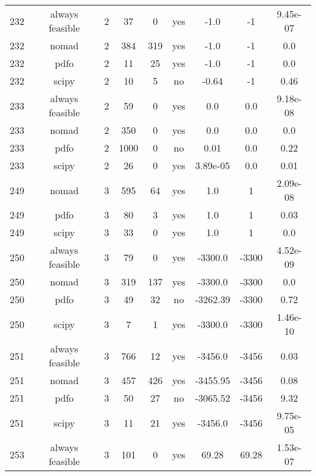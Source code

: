 \begin{scriptsize}
\begin{center}
\begin{longtable}{ccccccccc}
232 & always feasible &  2 &     37 &      0 &     yes &        -1.0 &          -1 & 9.45e-07\\
232 &           nomad &  2 &    384 &    319 &     yes &        -1.0 &          -1 &      0.0\\
232 &            pdfo &  2 &     11 &     25 &     yes &        -1.0 &          -1 &      0.0\\
232 &           scipy &  2 &     10 &      5 &      no &       -0.64 &          -1 &     0.46\\
233 & always feasible &  2 &     59 &      0 &     yes &         0.0 &         0.0 & 9.18e-08\\
233 &           nomad &  2 &    350 &      0 &     yes &         0.0 &         0.0 &      0.0\\
233 &            pdfo &  2 &   1000 &      0 &      no &        0.01 &         0.0 &     0.22\\
233 &           scipy &  2 &     26 &      0 &     yes &    3.89e-05 &         0.0 &     0.01\\
249 &           nomad &  3 &    595 &     64 &     yes &         1.0 &           1 & 2.09e-08\\
249 &            pdfo &  3 &     80 &      3 &     yes &         1.0 &           1 &     0.03\\
249 &           scipy &  3 &     33 &      0 &     yes &         1.0 &           1 &      0.0\\
250 & always feasible &  3 &     79 &      0 &     yes &     -3300.0 &       -3300 & 4.52e-09\\
250 &           nomad &  3 &    319 &    137 &     yes &     -3300.0 &       -3300 &      0.0\\
250 &            pdfo &  3 &     49 &     32 &      no &    -3262.39 &       -3300 &     0.72\\
250 &           scipy &  3 &      7 &      1 &     yes &     -3300.0 &       -3300 & 1.46e-10\\
251 & always feasible &  3 &    766 &     12 &     yes &     -3456.0 &       -3456 &     0.03\\
251 &           nomad &  3 &    457 &    426 &     yes &    -3455.95 &       -3456 &     0.08\\
251 &            pdfo &  3 &     50 &     27 &      no &    -3065.52 &       -3456 &     9.32\\
251 &           scipy &  3 &     11 &     21 &     yes &     -3456.0 &       -3456 & 9.75e-05\\
253 & always feasible &  3 &    101 &      0 &     yes &       69.28 &       69.28 & 1.53e-07\\

\end{longtable}
\end{center}
\end{scriptsize}
